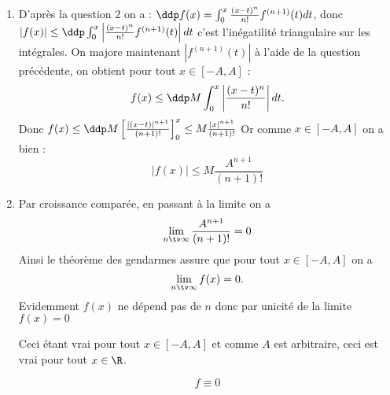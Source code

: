 \documentclass[a4paper, 11pt,reqno]{article}
\begin{document}
\begin{correction}
\begin{enumerate}
\begin{enumerate}
\item  D'après la question 2 on a : 
$\ddp f(x) = \int_0^x \frac{(x-t)^n}{n!} f^{(n+1)} (t) dt$, donc $|f(x)| \leq\ddp   \int_0^x \left|  \frac{(x-t)^n}{n!} f^{(n+1)} (t) \right| dt$ c'est l'inégatilité triangulaire sur les intégrales. On majore maintenant $\left|  f^{(n+1)} (t) \right| $ à l'aide de la question précédente, on obtient pour tout $x\in [-A,A]$ :
$$f(x) \leq  \ddp M  \int_0^x \left|  \frac{(x-t)^n}{n!}  \right| dt.$$
Donc $f(x) \leq \ddp M \left[ \frac{|(x-t)|^{n+1}}{(n+1)!}\right]_0^x \leq M  \frac{|x|^{n+1}}{(n+1)!}$ Or comme $x\in [-A,A]$ on a bien : 
$$|f(x)|\leq M\frac{A^{n+1}}{(n+1)!}$$
\item Par croissance comparée, en passant à la limite on a $$\lim_{n\tv \infty} \frac{A^{n+1}}{(n+1)!} = 0$$
Ainsi le théorème des gendarmes assure que pour tout $x\in [-A,A]$ on a 
$$\lim_{n\tv \infty} f(x) = 0.$$ Evidemment $f(x) $ ne dépend pas de $n$ donc par unicité de la limite $f(x) = 0$

Ceci étant vrai pour tout $x \in [-A,A]$ et comme $A$ est arbitraire, ceci est vrai pour tout $x \in \R$. 

$$f\equiv 0$$

\end{enumerate}

\end{enumerate}

\end{correction}
\end{document}
